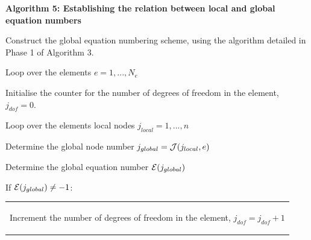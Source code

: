 \begin{center} {\bfseries  Algorithm 5\+: Establishing the relation between local and global equation numbers } \end{center} 


\begin{DoxyItemize}
\item Construct the global equation numbering scheme, using the algorithm detailed in Phase 1 of Algorithm 3.
\item Loop over the elements $ e=1,...,N_e $
\begin{DoxyItemize}
\item Initialise the counter for the number of degrees of freedom in the element, $ j_{dof}=0 $.
\item Loop over the element\textquotesingle{}s local nodes $ j_{local}=1,...,n$
\begin{DoxyItemize}
\item Determine the global node number $ j_{global} = {\cal J}(j_{local},e) $
\item Determine the global equation number ${\cal E}(j_{global})$
\item If ${\cal E}(j_{global}) \ne -1$\+: \tabulinesep=1mm
\begin{longtabu} spread 0pt [c]{*{1}{|X[-1]}|}
\hline

\begin{DoxyItemize}
\item Increment the number of degrees of freedom in the element, $ j_{dof}=j_{dof}+1$   
\end{DoxyItemize}\\
\end{longtabu}


\end{DoxyItemize}
\end{DoxyItemize}
\end{DoxyItemize}
